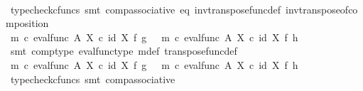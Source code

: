 \begin{isabellebody}
\ \ \ \ \ \ \ \ \ \ \ \ \isamarkupfalse%
\ {\isacharparenleft}{\kern0pt}typecheck{\isacharunderscore}{\kern0pt}cfuncs{\isacharcomma}{\kern0pt}\ smt\ comp{\isacharunderscore}{\kern0pt}associative{}\ eq\ inv{\isacharunderscore}{\kern0pt}transpose{\isacharunderscore}{\kern0pt}func{\isacharunderscore}{\kern0pt}def{}\ inv{\isacharunderscore}{\kern0pt}transpose{\isacharunderscore}{\kern0pt}of{\isacharunderscore}{\kern0pt}composition{\isacharparenright}{\kern0pt}\isanewline
\ \ \ \ \ \ \ \ \ \ \isamarkupfalse%
\ \isamarkupfalse%
\ {\isachardoublequoteopen}{\isacharparenleft}{\kern0pt}m\ {\isasymcirc}\isactrlsub c\ eval{\isacharunderscore}{\kern0pt}func\ A\ X{\isacharparenright}{\kern0pt}\ {\isasymcirc}\isactrlsub c\ {\isacharparenleft}{\kern0pt}id\ X\ {\isasymtimes}\isactrlsub f\ g{\isacharparenright}{\kern0pt}\ \ {\isacharequal}{\kern0pt}\ {\isacharparenleft}{\kern0pt}m\ {\isasymcirc}\isactrlsub c\ eval{\isacharunderscore}{\kern0pt}func\ A\ X{\isacharparenright}{\kern0pt}\ {\isasymcirc}\isactrlsub c\ {\isacharparenleft}{\kern0pt}id\ X\ {\isasymtimes}\isactrlsub f\ h{\isacharparenright}{\kern0pt}{\isachardoublequoteclose}\isanewline
\ \ \ \ \ \ \ \ \ \ \ \ \isamarkupfalse%
\ {\isacharparenleft}{\kern0pt}smt\ comp{\isacharunderscore}{\kern0pt}type\ eval{\isacharunderscore}{\kern0pt}func{\isacharunderscore}{\kern0pt}type\ m{\isacharunderscore}{\kern0pt}def{\isacharparenleft}{\kern0pt}{}{\isacharparenright}{\kern0pt}\ transpose{\isacharunderscore}{\kern0pt}func{\isacharunderscore}{\kern0pt}def{\isacharparenright}{\kern0pt}\isanewline
\ \ \ \ \ \ \ \ \ \ \isamarkupfalse%
\ \isamarkupfalse%
\ {\isachardoublequoteopen}m\ {\isasymcirc}\isactrlsub c\ {\isacharparenleft}{\kern0pt}eval{\isacharunderscore}{\kern0pt}func\ A\ X\ {\isasymcirc}\isactrlsub c\ {\isacharparenleft}{\kern0pt}id\ X\ {\isasymtimes}\isactrlsub f\ g{\isacharparenright}{\kern0pt}{\isacharparenright}{\kern0pt}\ \ {\isacharequal}{\kern0pt}\ m\ {\isasymcirc}\isactrlsub c\ {\isacharparenleft}{\kern0pt}eval{\isacharunderscore}{\kern0pt}func\ A\ X\ {\isasymcirc}\isactrlsub c\ {\isacharparenleft}{\kern0pt}id\ X\ {\isasymtimes}\isactrlsub f\ h{\isacharparenright}{\kern0pt}{\isacharparenright}{\kern0pt}{\isachardoublequoteclose}\isanewline
\ \ \ \ \ \ \ \ \ \ \ \ \isamarkupfalse%
\ {\isacharparenleft}{\kern0pt}typecheck{\isacharunderscore}{\kern0pt}cfuncs{\isacharcomma}{\kern0pt}\ smt\ comp{\isacharunderscore}{\kern0pt}associative{}{\isacharparenright}{\kern0pt}\isanewline

\end{isabellebody}
